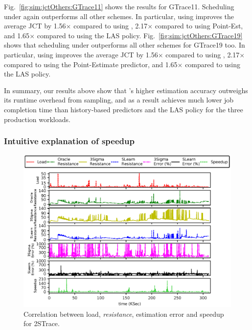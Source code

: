 Fig.~\ref{fig:sim:jctOthers:GTrace11} shows the results for GTrace11.  
Scheduling under \slearn again outperforms all other schemes. In particular,
using \slearn improves the average JCT by 1.56$\times$ compared to using
\primarybasepredict, 2.17$\times$ compared to using Point-Est,
and 1.65$\times$ compared to using the LAS policy.
Fig.~\ref{fig:sim:jctOthers:GTrace19} shows that
scheduling under \slearn outperforms all other schemes for GTrace19 too.
In particular, using \slearn improves
the average JCT by 1.56$\times$ compared to using \primarybasepredict,
2.17$\times$ compared to using the Point-Estimate predictor, and 1.65$\times$
compared to using the LAS policy.

In summary, our results above show that \slearn's higher estimation accuracy
outweighs its runtime overhead from sampling, and as a result achieves much
lower job completion time than history-based predictors and the LAS policy for
the three production workloads.


\subsubsection{Intuitive explanation of speedup}
\label{sec:sim:intuitionSpeedup}

\begin{figure}
	\includegraphics[width=1.0\linewidth]{figures/simulation/2STrace-Trial.eps}
	\caption{Correlation between load, \textit{resistance}, estimation error and speedup for 2STrace. }
	\label{figs:sim:intuitionSpeedup:allInOne}
\end{figure}

